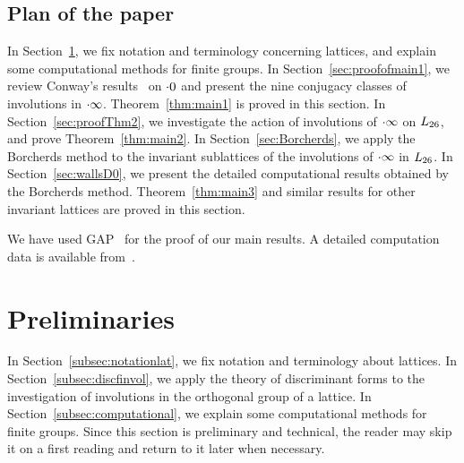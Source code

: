 \documentclass{amsart} %
\begin{document}
\subsection{Plan of the paper}\label{subsec:plan}
%
In Section~\ref{sec:prelim},
we fix notation and terminology concerning lattices, 
and explain some computational methods 
for finite groups.
In Section~\ref{sec:proofofmain1},
we review Conway's results~\cite[Chapter 10]{theCSbook} on $\cdot 0$
and present the nine conjugacy classes of involutions in $\cdot \infty$.
Theorem~\ref{thm:main1} is proved in this section.
In Section~\ref{sec:proofThm2},
we investigate the action of involutions of $\cdot \infty$ on $L_{26}$,
and prove Theorem~\ref{thm:main2}.
In Section~\ref{sec:Borcherds},
we apply the Borcherds method to the invariant sublattices of the involutions 
of $\cdot \infty$ in $L_{26}$.
In Section~\ref{sec:wallsD0},
we present the detailed computational results obtained by
 the Borcherds method.
 Theorem~\ref{thm:main3} and similar results for other invariant lattices are proved in this section.
%
\par
We have used GAP~\cite{GAP4} 
for the proof of our main results.
A detailed computation data is available from~\cite{affConwayCompdata}.
%
\section{Preliminaries}\label{sec:prelim}
%
In Section~\ref{subsec:notationlat}, 
we fix notation and terminology about lattices.
In Section~\ref{subsec:discfinvol},
we apply the theory of discriminant forms
to the investigation of involutions in the orthogonal group of a lattice.
In Section~\ref{subsec:computational},
we explain some computational methods 
for finite groups.
Since this section is preliminary and technical, the reader may skip it on a first reading and return to it later when necessary.
%
%
\end{document}
